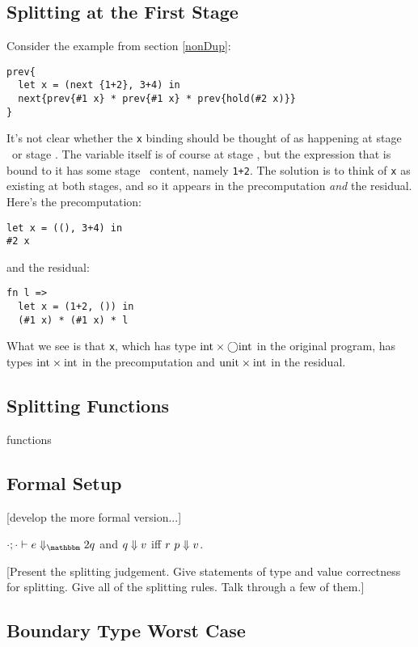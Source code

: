 \subsection {Splitting at the First Stage}

Consider the example from section \ref{nonDup}:

\begin{lstlisting} 
prev{
  let x = (next {1+2}, 3+4) in
  next{prev{#1 x} * prev{#1 x} * prev{hold(#2 x)}}
}
\end{lstlisting}

It's not clear whether the {\tt x} binding should be thought of as happening at stage \bbone\ or stage \bbtwo.
The variable itself is of course at stage \bbone, but the expression that is bound to it has some stage \bbtwo\ content, namely \verb|1+2|.
The solution is to think of {\tt x} as existing at both stages, and so it appears in the precomputation {\em and} the residual.
Here's the precomputation:
\begin{lstlisting} 
let x = ((), 3+4) in 
#2 x
\end{lstlisting}
and the residual:
\begin{lstlisting} 
fn l =>
  let x = (1+2, ()) in 
  (#1 x) * (#1 x) * l
\end{lstlisting}
What we see is that {\tt x}, which has type ${\rm int} \times \bigcirc {\rm int}$ in the original program, 
has types ${\rm int} \times {\rm int}$ in the precomputation and ${\rm unit} \times {\rm int}$ in the residual.

\subsection {Splitting Functions}

\TODO functions

\subsection {Formal Setup}

[develop the more formal version...]

  $\diatwo [\cdot;\cdot] e q$ and ${q} \Downarrow {v}$ iff ${r~p} \Downarrow {v}$.

[Present the splitting judgement.  Give statements of type and value correctness for splitting.  Give all of the splitting rules.  Talk through a few of them.]

\subsection {Boundary Type Worst Case}

